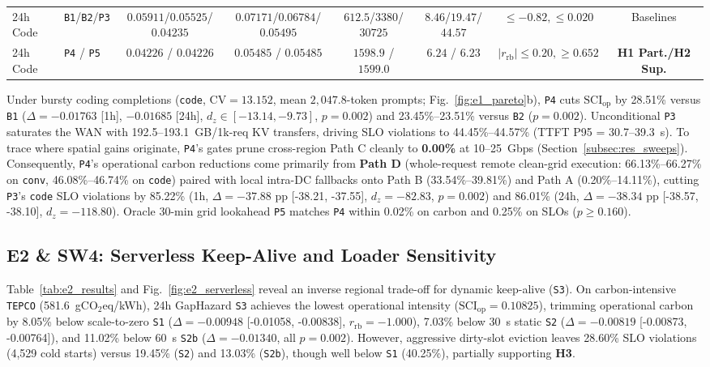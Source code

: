 \begin{table}[t]
{\begin{tabular}{@{}llcccccc@{}}
\midrule
24h Code & \texttt{B1}/\texttt{B2}/\texttt{P3} & $0.05911$/$0.05525$/$0.04235$ & $0.07171$/$0.06784$/$0.05495$ & $612.5$/$3380$/$30725$ & $8.46$/$19.47$/$44.57$ & $\le -0.82, \le 0.020$ & Baselines \\
24h Code & \texttt{P4} / \texttt{P5} & $\mathbf{0.04226}$ / $0.04226$ & $\mathbf{0.05485}$ / $0.05485$ & $\mathbf{1598.9}$ / $1599.0$ & $\mathbf{6.24}$ / $6.23$ & $|r_{\text{rb}}| \le 0.20, \ge 0.652$ & \textbf{H1 Part./H2 Sup.} \\
\bottomrule
\end{tabular}%
\ifdefined\BUILDELSEVIER}\fi
\end{table}

Under bursty coding completions (\texttt{code}, $\text{CV}=13.152$, mean $2{,}047.8$-token prompts; Fig.~\ref{fig:e1_pareto}b), \texttt{P4} cuts $\text{SCI}_{\text{op}}$ by 28.51\% versus \texttt{B1} ($\Delta = -0.01763$ [1h], $-0.01685$ [24h], $d_z \in [-13.14, -9.73]$, $p = 0.002$) and 23.45\%--23.51\% versus \texttt{B2} ($p = 0.002$). Unconditional \texttt{P3} saturates the WAN with 192.5--193.1~GB/1k-req KV transfers, driving SLO violations to 44.45\%--44.57\% (TTFT P95 = 30.7--39.3~s). To trace where spatial gains originate, \texttt{P4}'s gates prune cross-region Path C cleanly to \textbf{0.00\%} at 10--25~Gbps (Section~\ref{subsec:res_sweeps}). Consequently, \texttt{P4}'s operational carbon reductions come primarily from \textbf{Path D} (whole-request remote clean-grid execution: 66.13\%--66.27\% on \texttt{conv}, 46.08\%--46.74\% on \texttt{code}) paired with local intra-DC fallbacks onto Path B (33.54\%--39.81\%) and Path A (0.20\%--14.11\%), cutting \texttt{P3}'s \texttt{code} SLO violations by 85.22\% (1h, $\Delta = -37.88\text{ pp}$ [-38.21, -37.55], $d_z = -82.83$, $p = 0.002$) and 86.01\% (24h, $\Delta = -38.34\text{ pp}$ [-38.57, -38.10], $d_z = -118.80$). Oracle 30-min grid lookahead \texttt{P5} matches \texttt{P4} within 0.02\% on carbon and 0.25\% on SLOs ($p \ge 0.160$).

\subsection{\texorpdfstring{E2 \& SW4}{E2 and SW4}: Serverless Keep-Alive and Loader Sensitivity}\label{subsec:res_e2}
Table~\ref{tab:e2_results} and Fig.~\ref{fig:e2_serverless} reveal an inverse regional trade-off for dynamic keep-alive (\texttt{S3}). On carbon-intensive \texttt{TEPCO} (581.6~gCO$_2$eq/kWh), 24h GapHazard \texttt{S3} achieves the lowest operational intensity ($\text{SCI}_{\text{op}}=0.10825$), trimming operational carbon by 8.05\% below scale-to-zero \texttt{S1} ($\Delta=-0.00948$ [-0.01058, -0.00838], $r_{\text{rb}}=-1.000$), 7.03\% below 30~s static \texttt{S2} ($\Delta=-0.00819$ [-0.00873, -0.00764]), and 11.02\% below 60~s \texttt{S2b} ($\Delta=-0.01340$, all $p=0.002$). However, aggressive dirty-slot eviction leaves 28.60\% SLO violations (4,529 cold starts) versus 19.45\% (\texttt{S2}) and 13.03\% (\texttt{S2b}), though well below \texttt{S1} (40.25\%), partially supporting \textbf{H3}.

